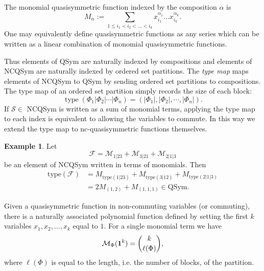 \documentclass[12pt,reqno]{amsart}
\numberwithin{definition}{section}
\theoremstyle{definition}
\newtheorem{example}[definition]{Example}
\newcommand{\SSS}{\mathcal{S}}
\newcommand{\type}{\operatorname{type}}
\newcommand{\ncM}{\mathcal{M}}
\newcommand{\poly}{\chi} %
\begin{document}
The monomial quasisymmetric function indexed by the composition $\alpha$ is 
$$M_{\alpha} := \sum_{1 \leq i_1 < i_2 < \ldots < i_k}
x_{i_1}^{\alpha_1} \ldots x_{i_k}^{\alpha_k}.$$  One may equivalently
define quasisymmetric functions as any series which can be written as a
linear combination of monomial quasisymmetric functions.



Thus elements of QSym are naturally indexed by
compositions and elements of NCQSym are naturally indexed by ordered
set partitions.  
The \emph{type map} maps elements of NCQSym to QSym by sending ordered set partitions to compositions.
The type map of an ordered set partition simply records the size of each block:
$$\type(\Phi_1|\Phi_2|\cdots|\Phi_n) = (|\Phi_1|, |\Phi_2|, \cdots, |\Phi_n|).$$
If $\mathcal{S} \in$ NCQSym is written as a sum of monomial terms,
applying the type map to each index is equivalent to allowing the
variables to commute.  In this way we extend the type map to nc-quasisymmetric functions themselves.

\begin{example}
Let $$\mathcal{F} = \ncM_{1|23} + \ncM_{3|21} + \ncM_{2|1|3}$$ be an element of NCQSym written in terms of monomials.  Then 
\begin{align*}
\textrm{type}(\mathcal{F}) & =  M_{\textrm{type} (1|23)} + M_{\textrm{type} (3|12)} + M_{\textrm{type} (2|1|3)} \\
&  = 2 M_{(1,2)} + M_{(1,1,1)} \in \textrm{QSym}.
\end{align*}
\end{example}



Given a quasisymmetric function in non-commuting variables (or
commuting), there is a naturally associated polynomial function
defined by setting the first $k$ variables $x_1, x_2, \ldots, x_k$ equal to $1$. For a single monomial term we have
$$\ncM_{\Phi} ({\bf 1}^k) = { k \choose \ell(\Phi) },$$
where $\ell(\Phi)$ is equal to the length, i.e. the number of blocks, of the partition. 

\end{document}
